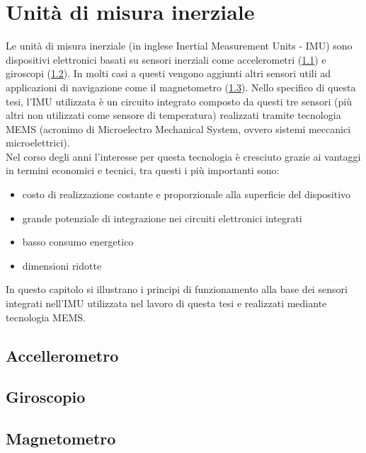 \chapter{Unità di misura inerziale}
\label{tecnologie}
Le unità di misura inerziale \cite{mems} (in inglese Inertial Measurement Units - IMU) sono dispositivi elettronici basati su sensori inerziali come accelerometri (\ref{accell}) e giroscopi (\ref{giroscopi}). In molti casi a questi vengono aggiunti altri sensori utili ad applicazioni di navigazione come il magnetometro (\ref{magnetometro}). Nello specifico di questa tesi, l'IMU utilizzata è un circuito integrato composto da questi tre sensori (più altri non utilizzati come sensore di temperatura) realizzati tramite tecnologia MEMS (acronimo di Microelectro Mechanical System, ovvero sistemi meccanici microelettrici).\\
Nel corso degli anni l'interesse per questa tecnologia è cresciuto grazie ai vantaggi in termini economici e tecnici, tra questi i più importanti sono:
\begin{itemize}
	\item costo di realizzazione costante e proporzionale alla superficie del dispositivo
	\item grande potenziale di integrazione nei circuiti elettronici integrati
	\item basso consumo energetico
	\item dimensioni ridotte
\end{itemize}
 
 In questo capitolo si illustrano i principi di funzionamento alla base dei sensori integrati nell'IMU utilizzata nel lavoro di questa tesi e realizzati mediante tecnologia MEMS.


\section{Accellerometro}
\label{accell}

\section{Giroscopio}
\label{giroscopi}


\section{Magnetometro}
\label{magnetometro}